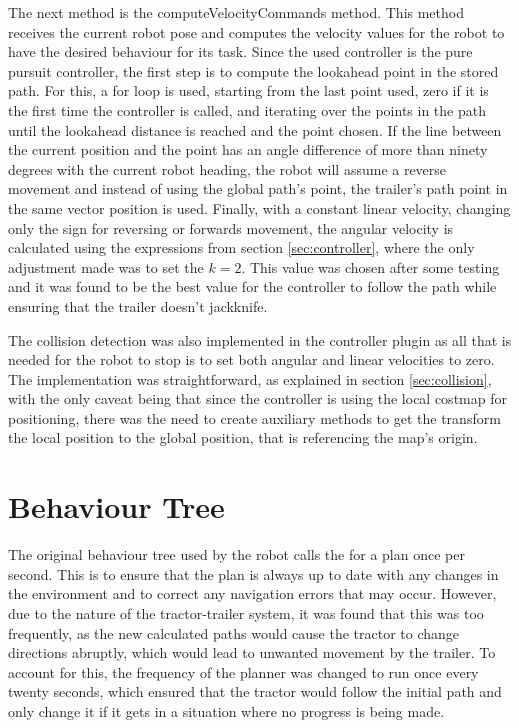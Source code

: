 The next method is the computeVelocityCommands method. This method receives the current 
robot pose and computes the velocity values for the robot to have the desired behaviour 
for its task. Since the used controller is the pure pursuit controller, the first step is 
to compute the lookahead point in the stored path. For this, a for loop is used, starting 
from the last point used, zero if it is the first time the controller is called, and iterating 
over the points in the path until the lookahead distance is reached and the point chosen. 
If the line between the current position and the point has an angle difference of more than 
ninety degrees with the current robot heading, the robot will assume a reverse movement and 
instead of using the global path's point, the trailer's path point in the same vector position 
is used. Finally, with a constant linear velocity, changing only the sign for reversing or 
forwards movement, the angular velocity is calculated using the expressions from section 
\ref{sec:controller}, where the only adjustment made was to set the $k=2$. This value 
was chosen after some testing and it was found to be the best value for the 
controller to follow the path while ensuring that the trailer doesn't jackknife.

The collision detection was also implemented in the controller plugin as all that is 
needed for the robot to stop is to set both angular and linear velocities to zero. The 
implementation was straightforward, as explained in section \ref{sec:collision}, with the 
only caveat being that since the controller is using the local costmap for positioning, 
there was the need to create auxiliary methods to get the transform the local position to 
the global position, that is referencing the map's origin.

\section{Behaviour Tree}
\label{sec:behaviour_tree}

The original behaviour tree used by the robot calls the for a plan once per second. This is 
to ensure that the plan is always up to date with any changes in the environment and to 
correct any navigation errors that may occur. However, due to the nature of the tractor-trailer system, 
it was found that this was too frequently, as the new calculated paths would 
cause the tractor to change directions abruptly, which would lead to unwanted movement by the trailer. 
To account for this, the frequency of the planner was changed to run once every twenty seconds, 
which ensured that the tractor would follow the initial path and only change it if 
it gets in a situation where no progress is being made.